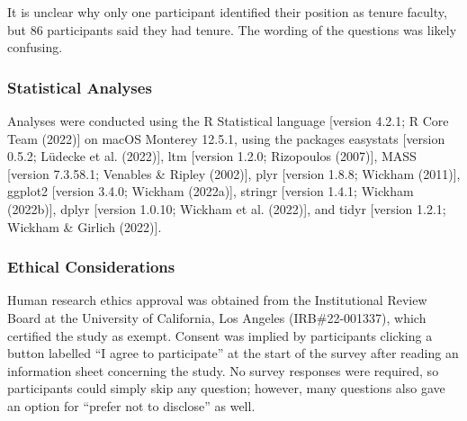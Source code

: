 \documentclass[
  twocolumn]{article}
\begin{document}
It is unclear why only one participant identified their position as
tenure faculty, but 86 participants said they had tenure. The wording of
the questions was likely confusing.

\subsubsection{Statistical Analyses}\label{statistical-analyses}

Analyses were conducted using the R Statistical language {[}version
4.2.1; R Core Team (2022){]} on macOS Monterey 12.5.1, using the
packages easystats {[}version 0.5.2; Lüdecke et al. (2022){]}, ltm
{[}version 1.2.0; Rizopoulos (2007){]}, MASS {[}version 7.3.58.1;
Venables \& Ripley (2002){]}, plyr {[}version 1.8.8; Wickham (2011){]},
ggplot2 {[}version 3.4.0; Wickham (2022a){]}, stringr {[}version 1.4.1;
Wickham (2022b){]}, dplyr {[}version 1.0.10; Wickham et al. (2022){]},
and tidyr {[}version 1.2.1; Wickham \& Girlich (2022){]}.

\subsubsection{Ethical Considerations}\label{ethical-considerations}

Human research ethics approval was obtained from the Institutional
Review Board at the University of California, Los Angeles
(IRB\#22-001337), which certified the study as exempt. Consent was
implied by participants clicking a button labelled ``I agree to
participate'' at the start of the survey after reading an information
sheet concerning the study. No survey responses were required, so
participants could simply skip any question; however, many questions
also gave an option for ``prefer not to disclose'' as well.
\end{document}

